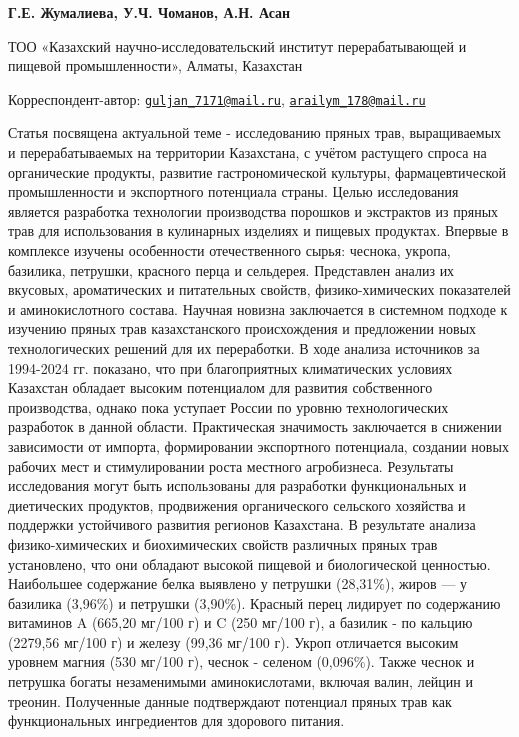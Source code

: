 
\begin{articleheader}

{\bfseries
Г.Е. Жумалиева\textsuperscript{\envelope },
У.Ч. Чоманов,
А.Н. Асан\textsuperscript{\envelope }
}
\end{articleheader}

\begin{affiliation}
ТОО «Казахский научно-исследовательский институт перерабатывающей и
пищевой промышленности», Алматы, Казахстан

\raggedright \textsuperscript{\envelope }Корреспондент-автор:
\href{mailto:guljan_7171@mail.ru}{\nolinkurl{guljan\_7171@mail.ru}},
\href{mailto:arailym_178@mail.ru}{\nolinkurl{arailym\_178@mail.ru}}
\end{affiliation}

Статья посвящена актуальной теме - исследованию пряных трав,
выращиваемых и перерабатываемых на территории Казахстана, с учётом
растущего спроса на органические продукты, развитие гастрономической
культуры, фармацевтической промышленности и экспортного потенциала
страны. Целью исследования является разработка технологии производства
порошков и экстрактов из пряных трав для использования в кулинарных
изделиях и пищевых продуктах. Впервые в комплексе изучены особенности
отечественного сырья: чеснока, укропа, базилика, петрушки, красного
перца и сельдерея. Представлен анализ их вкусовых, ароматических и
питательных свойств, физико-химических показателей и аминокислотного
состава. Научная новизна заключается в системном подходе к изучению
пряных трав казахстанского происхождения и предложении новых
технологических решений для их переработки. В ходе анализа источников за
1994-2024 гг. показано, что при благоприятных климатических условиях
Казахстан обладает высоким потенциалом для развития собственного
производства, однако пока уступает России по уровню технологических
разработок в данной области. Практическая значимость заключается в
снижении зависимости от импорта, формировании экспортного потенциала,
создании новых рабочих мест и стимулировании роста местного агробизнеса.
Результаты исследования могут быть использованы для разработки
функциональных и диетических продуктов, продвижения органического
сельского хозяйства и поддержки устойчивого развития регионов
Казахстана. В результате анализа физико-химических и биохимических
свойств различных пряных трав установлено, что они обладают высокой
пищевой и биологической ценностью. Наибольшее содержание белка выявлено
у петрушки (28,31\%), жиров --- у базилика (3,96\%) и петрушки (3,90\%).
Красный перец лидирует по содержанию витаминов A (665,20 мг/100 г) и C
(250 мг/100 г), а базилик - по кальцию (2279,56 мг/100 г) и железу
(99,36 мг/100 г). Укроп отличается высоким уровнем магния (530 мг/100
г), чеснок - селеном (0,096\%). Также чеснок и петрушка богаты
незаменимыми аминокислотами, включая валин, лейцин и треонин. Полученные
данные подтверждают потенциал пряных трав как функциональных
ингредиентов для здорового питания.

